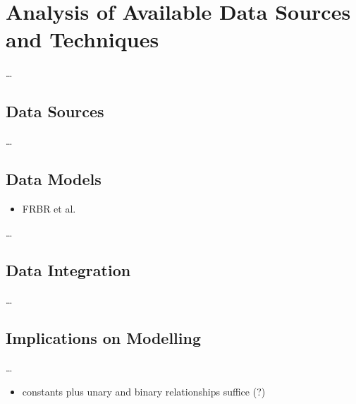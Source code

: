 \chapter{Analysis of Available Data Sources and Techniques}
\label{chap:analysis}

\dots

\section{Data Sources}

\dots

\section{Data Models}

\begin{itemize}
  \item
    FRBR et al.
\end{itemize}

\dots

\section{Data Integration}

\dots

\section{Implications on Modelling}

\dots

\begin{itemize}
  \item
    constants plus unary and binary relationships suffice (?)
\end{itemize}


